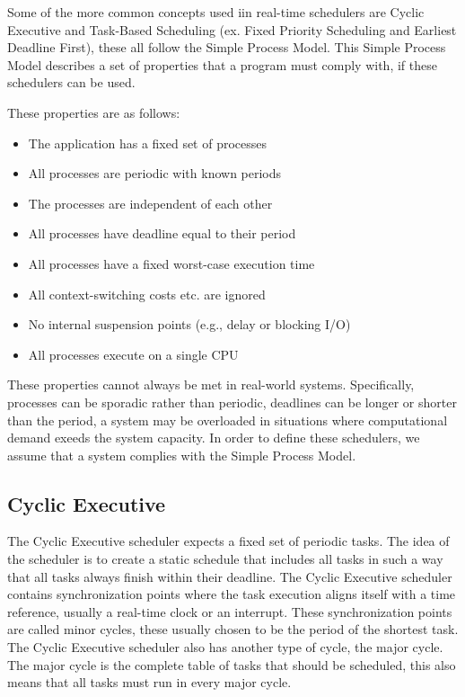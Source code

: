 Some of the more common concepts used iin real-time schedulers are Cyclic Executive and Task-Based Scheduling (ex. Fixed Priority Scheduling and Earliest Deadline First), these all follow the Simple Process Model. This Simple Process Model describes a set of properties that a program must comply with, if these  schedulers can be used.

These properties are as follows\cite{simpleprocessmodel-slides}:

\begin{itemize}
\item The application has a fixed set of processes
\item All processes are periodic with known periods
\item The processes are independent of each other
\item All processes have deadline equal to their period
\item All processes have a fixed worst-case execution time
\item All context-switching costs etc. are ignored
\item No internal suspension points (e.g., delay or blocking I/O)
\item All processes execute on a single CPU
\end{itemize}

These properties cannot always be met in real-world systems. Specifically, processes can be sporadic rather than periodic, deadlines can be longer or shorter than the period, a system may be overloaded in situations where computational demand exeeds the system capacity. In order to define these schedulers, we assume that a system complies with the Simple Process Model.

\subsection{Cyclic Executive}
The Cyclic Executive scheduler expects a fixed set of periodic tasks. The idea of the scheduler is to create a static schedule that includes all tasks in such a way that all tasks always finish within their deadline. The Cyclic Executive scheduler contains synchronization points where the task execution aligns itself with a time reference, usually a real-time clock or an interrupt. These synchronization points are called minor cycles, these usually chosen to be the period of the shortest task. The Cyclic Executive scheduler also has another type of cycle, the major cycle. The major cycle is the complete table of tasks that should be scheduled, this also means that all tasks must run in every major cycle.

